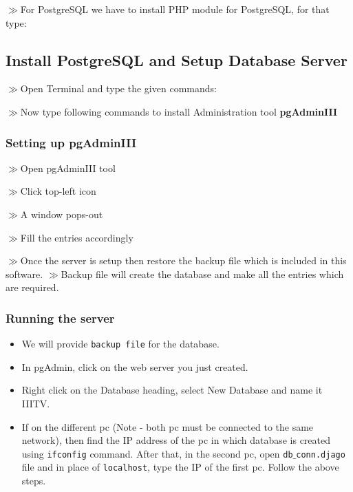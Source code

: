 \documentclass[]{article}
\begin{document}
% 
%
% 
%




$\gg$For PostgreSQL we have to install PHP module for PostgreSQL, for that type:


\subsection{Install PostgreSQL and Setup Database Server}
$\gg$Open Terminal and type the given commands:

$\gg$Now type following commands to install Administration tool \textbf{pgAdminIII}

\subsubsection{Setting up pgAdminIII}
$\gg$Open pgAdminIII tool

$\gg$Click top-left icon

$\gg$A window pops-out

$\gg$Fill the entries accordingly

$\gg$Once the server is setup then restore the backup file which is included in this software.
$\gg$Backup file will create the database and make all the entries which are required.
\subsubsection{Running the server}
\begin{itemize}
\item We will provide \texttt{backup file} for the database.
\item In pgAdmin, click on the web server you just created.
\item Right click on the Database heading, select New Database and name it IIITV.

\item If on the different pc (Note - both pc must be connected to the same network), then find the IP address of the pc in which database is created using \texttt{ifconfig} command. After that, in the second pc, open \texttt{db$\_$conn.djago} file and in place of \texttt{localhost}, type the IP of the first pc. Follow the above steps.
\end{itemize}
\end{document}
